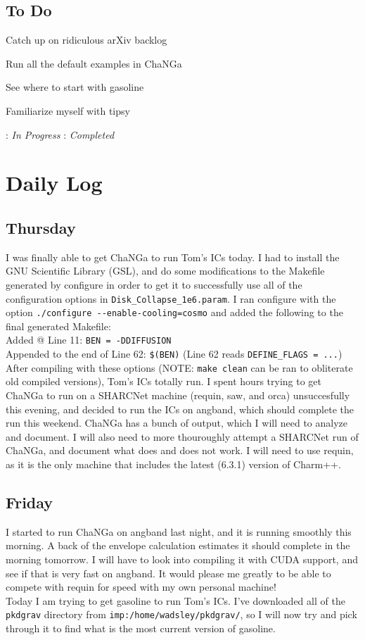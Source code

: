 \documentclass[11pt,letterpaper]{article}
\begin{document}
\subsection*{To Do}
\begin{bullets}
\item[\checkmark] Catch up on ridiculous arXiv backlog
\item[\checkmark] Run all the default examples in ChaNGa
\item[\textleaf] See where to start with gasoline
\item Familiarize myself with tipsy
\end{bullets}

\textleaf : \textit{In Progress} \qquad \checkmark : \textit{Completed}

\section*{Daily Log}
\subsection*{Thursday}
I was finally able to get ChaNGa to run Tom's ICs today.  I had to install the GNU Scientific Library (GSL), and do some modifications to the Makefile generated
by configure in order to get it to successfully use all of the configuration 
options in \verb!Disk_Collapse_1e6.param!.  I ran configure with the option
\verb!./configure --enable-cooling=cosmo! and added the following to the final
generated Makefile:\\
Added @ Line 11: \verb!BEN = -DDIFFUSION!\\
Appended to the end of Line 62: \verb!$(BEN)! (Line 62 reads \verb!DEFINE_FLAGS = ...!)\\
After compiling with these options (NOTE: \verb!make clean! can be ran to 
obliterate old compiled versions), Tom's ICs totally run.  I spent hours trying
to get ChaNGa to run on a SHARCNet machine (requin, saw, and orca) unsuccesfully
this evening, and decided to run the ICs on angband, which should complete the
run this weekend.  ChaNGa has a bunch of output, which I will need to analyze 
and document.  I will also need to more thouroughly attempt a SHARCNet run of
ChaNGa, and document what does and does not work.  I will need to use requin, as
it is the only machine that includes the latest (6.3.1) version of Charm++.

\subsection*{Friday}
I started to run ChaNGa on angband last night, and it is running smoothly this
morning.  A back of the envelope calculation estimates it should complete in the
morning tomorrow.  I will have to look into compiling it with CUDA support, and
see if that is very fast on angband.  It would please me greatly to be able to
compete with requin for speed with my own personal machine!\\
Today I am trying to get gasoline to run Tom's ICs.  I've downloaded all of the
\verb!pkdgrav! directory from \verb!imp:/home/wadsley/pkdgrav/!, so I will now
try and pick through it to find what is the most current version of gasoline.
\end{document}

